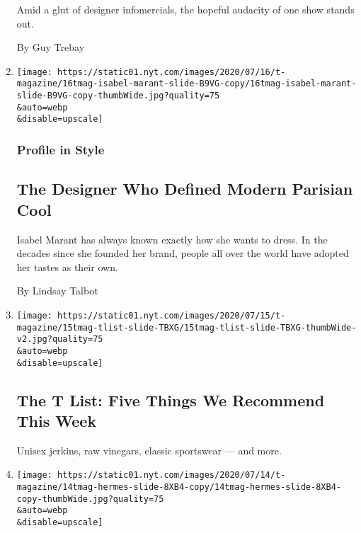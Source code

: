 \begin{enumerate}
  Amid a glut of designer infomercials, the hopeful audacity of one show
  stands out.

  By Guy Trebay
\item
  \href{/2020/07/16/t-magazine/isabel-marant.html}{}

  \texttt{[image: https://static01.nyt.com/images/2020/07/16/t-magazine/16tmag-isabel-marant-slide-B9VG-copy/16tmag-isabel-marant-slide-B9VG-copy-thumbWide.jpg?quality=75\\\&auto=webp\\\&disable=upscale]}

  \hypertarget{profile-in-style}{%
  \subsubsection{Profile in Style}\label{profile-in-style}}

  \hypertarget{the-designer-who-defined-modern-parisian-cool}{%
  \subsection{The Designer Who Defined Modern Parisian
  Cool}\label{the-designer-who-defined-modern-parisian-cool}}

  Isabel Marant has always known exactly how she wants to dress. In the
  decades since she founded her brand, people all over the world have
  adopted her tastes as their own.

  By Lindsay Talbot
\item
  \href{/2020/07/16/t-magazine/margo-price-album-tlist.html}{}

  \texttt{[image: https://static01.nyt.com/images/2020/07/15/t-magazine/15tmag-tlist-slide-TBXG/15tmag-tlist-slide-TBXG-thumbWide-v2.jpg?quality=75\\\&auto=webp\\\&disable=upscale]}

  \hypertarget{the-t-list-five-things-we-recommend-this-week-1}{%
  \subsection{The T List: Five Things We Recommend This
  Week}\label{the-t-list-five-things-we-recommend-this-week-1}}

  Unisex jerkins, raw vinegars, classic sportswear --- and more.
\item
  \href{/2020/07/15/t-magazine/hermes-fashion-savoir-faire.html}{}

  \texttt{[image: https://static01.nyt.com/images/2020/07/14/t-magazine/14tmag-hermes-slide-8XB4-copy/14tmag-hermes-slide-8XB4-copy-thumbWide.jpg?quality=75\\\&auto=webp\\\&disable=upscale]}


\end{enumerate}
